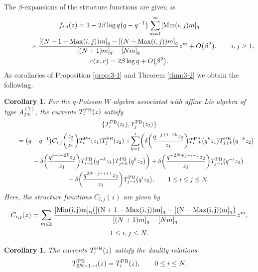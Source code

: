 \documentclass[10pt,a4paper]{amsart}
\numberwithin{equation}{section}
\newtheorem{Corollary}[Theorem]{Corollary}
\begin{document}
The $\beta$-expansions of the structure functions are given as
\begin{gather*}
f_{i,j}(z)=1-2 \beta \log q \big(q-q^{-1}\big)\sum_{m=1}^\infty
[\operatorname{Min}(i,j)m ]_q
\\ \hphantom{f_{i,j}(z)=}
{}\times\frac{[(N+1-\operatorname{Max}(i,j))m]_q-[(N-\operatorname{Max}(i,j))m]_q}
{[(N+1)m]_q-[Nm]_q}z^m+O\big(\beta^2\big),\qquad i, j \geq 1,
\\
c(x,r)=2 \beta \log q+O\big(\beta^2\big).
\end{gather*}
As corollaries of Proposition \ref{prop:3-1} and Theorem \ref{thm:3-2}
we obtain the following.

\begin{Corollary}
For the $q$-Poisson $W$-algebra associated with affine Lie algebra
of type $A_{2N}^{(2)}$, the currents $T_i^{\rm PB}(z)$ satisfy
\begin{gather}
\big\{T_i^{\rm PB}(z_1),T_j^{\rm PB}(z_2)\big\}\notag
\\ \qquad
{}=\big(q-q^{-1}\big)C_{i,j}\bigg(\frac{z_2}{z_1}\bigg)T_i^{\rm PB}(z_1)T_j^{\rm PB}(z_2)\notag
+\!\sum_{k=1}^i\!\bigg(\delta\bigg(\frac{q^{-j+i-2k}z_2}{z_1}\bigg)
T_{i-k}^{\rm PB}\big(q^{k}z_1\big)T_{j+k}^{\rm PB}\big(q^{-k}z_2\big)
\\ \qquad\hphantom{=}
{}-\delta\bigg(\frac{q^{j-i+2k}z_2}{z_1}\bigg)
T_{i-k}^{\rm PB}\big(q^{-k}z_1\big)T_{j+k}^{\rm PB}\big(q^{k}z_2\big)\bigg)\notag
+\delta\bigg(\frac{q^{-2N+j-i-1}z_2}{z_1}\bigg)
T_{j-i}^{\rm PB}\big(q^{-i}z_2\big)
\\ \qquad\hphantom{=}
{}-\delta\bigg(\frac{q^{2N-j+i+1}z_2}{z_1}\bigg) T_{j-i}^{\rm PB}\big(q^{i}z_2\big),\qquad
1\leq i \leq j \leq N.
\label{def:q-Poisson}
\end{gather}
Here, the structure functions $C_{i,j}(z)$ are given by
\begin{gather*}
C_{i,j}(z)=\sum_{m \in \mathbb{Z}}\frac{[\rm Min(i,j)m]_q
\bigl([(N+1-\operatorname{Max}(i,j))m]_q-[(N-\operatorname{Max}(i,j))m]_q\bigr)}
{[(N+1)m]_q-[Nm]_q}z^m,
\\
1\leq i,j \leq N.
\end{gather*}
\end{Corollary}

\begin{Corollary}
The currents $T_i^{\rm PB}(z)$ satisfy the duality relations
\begin{gather}
T_{2N+1-i}^{\rm PB}(z)=T_i^{\rm PB}(z),\qquad 0\leq i \leq N.
\label{def:q-Poisson2}
\end{gather}
\end{Corollary}
\end{document}
